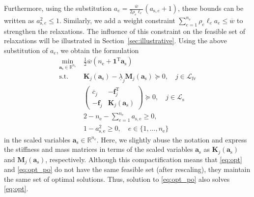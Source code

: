 \documentclass[final,onefignum,onetabnum]{siamart220329}
\begin{document}
%
Furthermore, using the substitution $a_e = \frac{\overline{w}}{2\rho_e\ell_e} (a_{\mathrm{s},e} + 1)$, these bounds can be written as $a_{\mathrm{s},e}^2 \le 1$. %
%
Similarly, we add a weight constraint $\sum_{e=1}^{n_\mathrm{e}} \rho_e \ell_e a_e \le \overline{w}$ to strengthen the relaxations.
The influence of this constraint on the feasible set of relaxations will be illustrated in Section~\ref{sec:illustrative}. Using the above substitution of $a_e$, we obtain the formulation
%
\begin{subequations}\label{eq:opt_po}
	\begin{align}
		\min_{\mathbf{a}_{{\mathrm{s}}}\in\mathbb{R}^{n_\mathrm{e}}}\; & {\frac{1}{2}} \overline{w} (n_\mathrm{e} + \mathbf{1}^\mathrm{T} \mathbf{a}_\mathrm{s})\label{eq:opt_objective_po}\\
		\text{s.t.}\; & \mathbf{K}_j(\mathbf{a}_\mathrm{s}) - \underline{\lambda}_j \mathbf{M}_j(\mathbf{a}_\mathrm{s}) \succeq 0, \quad j \in {\mathcal{L}_\mathrm{fv}}\label{eq:opt_fv_po}\\
		& \begin{pmatrix}
			\overline{c}_j & -\mathbf{f}_j^\mathrm{T}\\
			-\mathbf{f}_j & \mathbf{K}_j(\mathbf{a}_\mathrm{s})
		\end{pmatrix} \succeq 0,\quad j \in {\mathcal{L}_\mathrm{s}}\label{eq:opt_static_po}\\
            & 2-n_\mathrm{e} - \sum_{e=1}^{n_\mathrm{e}} a_{\mathrm{s},e} \ge 0,\label{eq:opt_weight_po}\\
		& 1 - a_\mathrm{s,e}^2 \ge 0, \quad e \in \{1,\dots,n_\mathrm{e}\}\label{eq:opt_nonneg_po}
	\end{align}
\end{subequations}
%
{in the scaled variables $\mathbf{a}_{\mathrm{s}} \in \mathbb{R}^{n_\mathrm{e}}$. Here,} we slightly abuse the notation and express the stiffness and mass matrices in terms of the scaled variables $\mathbf{a}_\mathrm{s}$ as $\mathbf{K}_j(\mathbf{a}_\mathrm{s})$ and $\mathbf{M}_j(\mathbf{a}_\mathrm{s})$, respectively. {Although this compactification means that \eqref{eq:opt} and \eqref{eq:opt_po} do not have the same feasible set (after rescaling), they maintain the same set of optimal solutions. Thus, solution to \eqref{eq:opt_po} also solves \eqref{eq:opt}.}
\end{document}
